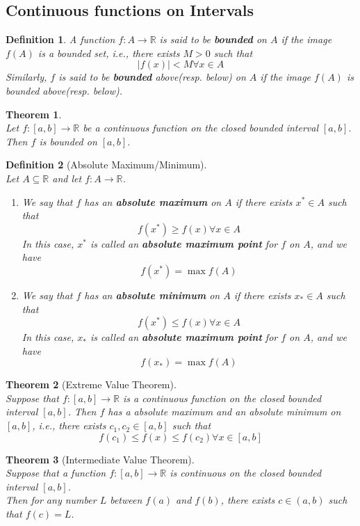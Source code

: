 \documentclass[8pt]{article}
\newtheorem{definition}{Definition}[section]
\newtheorem{theorem}{Theorem}[section]
\theoremstyle{definition}
\begin{document}
\subsection{Continuous functions on Intervals}
\begin{definition}\normalfont A function $f:A\to\mathbb{R}$ is said to be \textbf{bounded} on $A$ if the image $f(A)$ is a bounded set, i.e., there exists $M>0$ such that 
\[
|f(x)|<M\forall x\in A
\]
Similarly, $f$ is said to be \textbf{bounded} above(resp. below) on $A$ if the image $f(A)$ is bounded above(resp. below).
\end{definition}
\begin{theorem}\hfill\\\normalfont
Let $f:[a,b]\to\mathbb{R}$ be a continuous function on the closed bounded interval $[a,b]$. Then $f$ is bounded on $[a,b]$.
\end{theorem}
\begin{definition}[Absolute Maximum/Minimum]
\hfill\\\normalfont Let $A\subseteq\mathbb{R}$ and let $f:A\to\mathbb{R}$.
\begin{enumerate}
\item We say that $f$ has an \textbf{absolute maximum} on $A$ if there exists $x^\ast\in A$ such that
\[
f(x^\ast)\geq f(x) \forall x\in A
\]
In this case, $x^\ast$ is called an \textbf{absolute maximum point} for $f$ on $A$, and we have
\[
f(x^\ast)=\max f(A)
\]
\item We say that $f$ has an \textbf{absolute minimum} on $A$ if there exists $x_\ast\in A$ such that
\[
f(x^\ast)\leq f(x) \forall x\in A
\]
In this case, $x_\ast$ is called an \textbf{absolute maximum point} for $f$ on $A$, and we have
\[
f(x_\ast)=\max f(A)
\]
\end{enumerate}
\end{definition}
\begin{theorem}[Extreme Value Theorem]
\hfill\\\normalfont
Suppose that $f:[a,b]\to\mathbb{R}$ is a continuous function on the closed bounded interval $[a,b]$. Then $f$ has a absolute maximum and an absolute minimum on $[a,b]$, i.e., there exists $c_1, c_2\in[a,b]$ such that
\[
f(c_1)\leq f(x)\leq f(c_2)\forall x\in [a,b]
\]
\end{theorem}
\begin{theorem}[Intermediate Value Theorem]
\hfill\\\normalfont Suppose that a function $f:[a,b]\to\mathbb{R}$ is continuous on the closed bounded interval $[a,b]$.\\
Then for any number $L$ between $f(a)$ and $f(b)$, there exists $c\in(a,b)$ such that $f(c)=L$.
\end{theorem}
\end{document}

